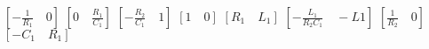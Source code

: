 $[-\frac{1}{R_1}\quad 0]$
$[0\quad \frac{R_1}{C_1}]$
$[-\frac{R_2}{C_1}\quad 1]$
$[1 \quad 0]$
$[R_1\quad L_1]$
$[-\frac{L_1}{R_2 C_1} \quad -L1]$
$[\frac{1}{R_2}\quad 0]$
$[-C_1\quad R_1]$
